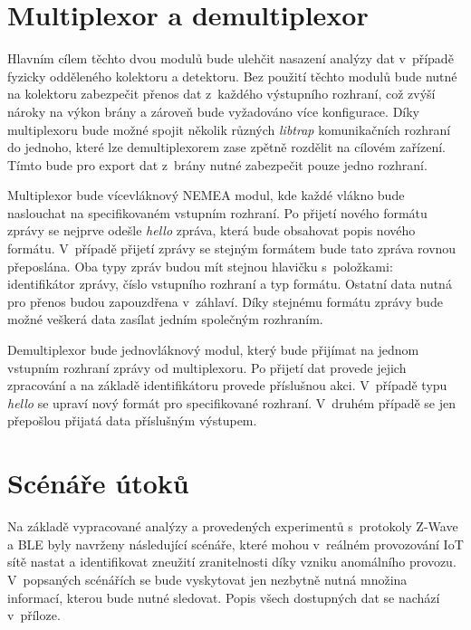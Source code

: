  \section{Multiplexor a demultiplexor}
 Hlavním cílem těchto dvou modulů bude ulehčit nasazení analýzy dat v~případě fyzicky odděleného
 kolektoru a detektoru. Bez použití těchto modulů bude nutné na kolektoru zabezpečit přenos dat
 z~každého výstupního rozhraní, což zvýší nároky na výkon brány a zároveň bude vyžadováno
 více konfigurace. Díky multiplexoru bude možné spojit několik různých \textit{libtrap} komunikačních 
 rozhraní do jednoho, které lze demultiplexorem zase zpětně rozdělit na cílovém zařízení.
 Tímto bude pro export dat z~brány nutné zabezpečit pouze jedno rozhraní.

 Multiplexor bude vícevláknový NEMEA modul, kde každé vlákno bude naslouchat na specifikovaném
 vstupním rozhraní. Po přijetí nového formátu zprávy se nejprve odešle \textit{hello} zpráva, která
 bude obsahovat popis nového formátu. V~případě přijetí zprávy se stejným formátem bude tato 
 zpráva rovnou přeposlána. Oba typy zpráv budou mít stejnou hlavičku s~položkami: 
 identifikátor zprávy, 
 číslo vstupního rozhraní a typ formátu. Ostatní data nutná pro přenos budou zapouzdřena
v~záhlaví. Díky stejnému formátu zprávy bude možné veškerá data zasílat jedním společným rozhraním.
 
 Demultiplexor bude jednovláknový modul, který bude přijímat na jednom vstupním rozhraní zprávy
 od multiplexoru. Po přijetí dat provede jejich zpracování a na základě identifikátoru 
 provede příslušnou akci. V~případě typu \textit{hello} se upraví nový formát pro specifikované 
 rozhraní. V~druhém případě se jen přepošlou přijatá data příslušným výstupem.
 
 \section{Scénáře útoků} \label{utoky}
 Na základě vypracované analýzy a provedených experimentů s~protokoly Z-Wave a BLE byly navrženy
 následující scénáře, které mohou v~reálném provozování IoT sítě nastat a identifikovat zneužití
 zranitelnosti díky vzniku anomálního provozu. V~popsaných scénářích se bude vyskytovat jen nezbytně
 nutná množina informací, kterou bude nutné sledovat. Popis všech dostupných dat se nachází v~příloze.
 
